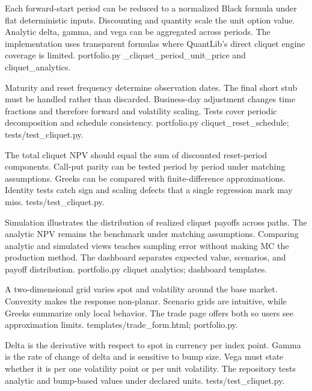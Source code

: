 {Each forward-start period can be reduced to a normalized Black formula under flat deterministic inputs.}
{Discounting and quantity scale the unit option value.}
{Analytic delta, gamma, and vega can be aggregated across periods.}
{The implementation uses transparent formulas where QuantLib's direct cliquet engine coverage is limited.}
{portfolio.py \_cliquet\_period\_unit\_price and cliquet\_analytics.}

{Maturity and reset frequency determine observation dates.}
{The final short stub must be handled rather than discarded.}
{Business-day adjustment changes time fractions and therefore forward and volatility scaling.}
{Tests cover periodic decomposition and schedule consistency.}
{portfolio.py cliquet\_reset\_schedule; tests/test\_cliquet.py.}

{The total cliquet NPV should equal the sum of discounted reset-period components.}
{Call-put parity can be tested period by period under matching assumptions.}
{Greeks can be compared with finite-difference approximations.}
{Identity tests catch sign and scaling defects that a single regression mark may miss.}
{tests/test\_cliquet.py.}

{Simulation illustrates the distribution of realized cliquet payoffs across paths.}
{The analytic NPV remains the benchmark under matching assumptions.}
{Comparing analytic and simulated views teaches sampling error without making MC the production method.}
{The dashboard separates expected value, scenarios, and payoff distribution.}
{portfolio.py cliquet analytics; dashboard templates.}

{A two-dimensional grid varies spot and volatility around the base market.}
{Convexity makes the response non-planar.}
{Scenario grids are intuitive, while Greeks summarize only local behavior.}
{The trade page offers both so users see approximation limits.}
{templates/trade\_form.html; portfolio.py.}

{Delta is the derivative with respect to spot in currency per index point.}
{Gamma is the rate of change of delta and is sensitive to bump size.}
{Vega must state whether it is per one volatility point or per unit volatility.}
{The repository tests analytic and bump-based values under declared units.}
{tests/test\_cliquet.py.}

